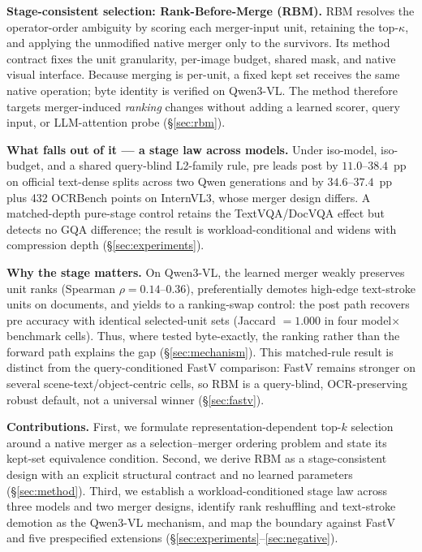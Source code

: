 \documentclass[journal]{IEEEtran}
\begin{document}
\textbf{Stage-consistent selection: Rank-Before-Merge (RBM).} RBM resolves the
operator-order ambiguity by scoring each merger-input unit, retaining the
top-$\kappa$, and applying the unmodified native merger only to the survivors.
Its method contract fixes the unit granularity, per-image budget, shared mask,
and native visual interface. Because merging is per-unit, a fixed kept set
receives the same native operation; byte identity is verified on Qwen3-VL. The
method therefore targets merger-induced \emph{ranking} changes without adding a
learned scorer, query input, or LLM-attention probe (\S\ref{sec:rbm}).

\textbf{What falls out of it --- a stage law across models.} Under iso-model,
iso-budget, and a shared query-blind L2-family rule, pre leads post by
$11.0$--$38.4$~pp on
official text-dense splits across two Qwen generations and by
$34.6$--$37.4$~pp plus 432 OCRBench points on InternVL3, whose merger design
differs. A matched-depth pure-stage control retains the TextVQA/DocVQA effect
but detects no GQA difference; the result is workload-conditional and widens
with compression depth (\S\ref{sec:experiments}).

\textbf{Why the stage matters.} On Qwen3-VL, the learned merger weakly preserves
unit ranks (Spearman $\rho=0.14$--$0.36$), preferentially demotes high-edge
text-stroke units on documents, and yields to a ranking-swap control: the post
path recovers pre accuracy with identical selected-unit sets (Jaccard $=1.000$
in four model$\times$benchmark cells). Thus, where tested byte-exactly, the
ranking rather than the forward path explains the gap (\S\ref{sec:mechanism}).
This matched-rule result is distinct from the query-conditioned FastV comparison:
FastV remains stronger on several scene-text/object-centric cells, so RBM is a
query-blind, OCR-preserving robust default, not a universal winner
(\S\ref{sec:fastv}).

\textbf{Contributions.}
First, we formulate representation-dependent top-$k$ selection around a native
merger as a selection--merger ordering problem and state its kept-set
equivalence condition. Second, we derive RBM as a stage-consistent design with
an explicit structural contract and no learned parameters (\S\ref{sec:method}).
Third, we establish a workload-conditioned stage law across three models and
two merger designs, identify rank reshuffling and text-stroke demotion as the
Qwen3-VL mechanism, and map the boundary against FastV and five prespecified
extensions (\S\ref{sec:experiments}--\ref{sec:negative}).
\end{document}
